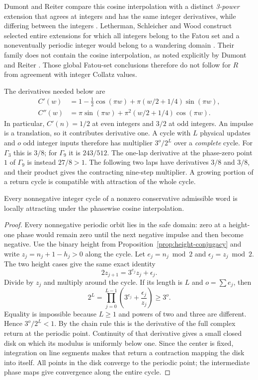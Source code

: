 Dumont and Reiter compare this cosine interpolation with a distinct
\emph{3-power} extension that agrees at integers and has the same
integer derivatives, while differing between the integers
\cite[Sections~1--2]{dumont-reiter-2003}.
Letherman, Schleicher and Wood construct selected entire extensions
for which all integers belong to the Fatou set and a noneventually
periodic integer would belong to a wandering domain
\cite{letherman-schleicher-wood-1999}.
Their family does not contain the cosine interpolation, as noted
explicitly by Dumont and Reiter \cite[Section~1]{dumont-reiter-2003}.
Those global Fatou-set conclusions therefore do not follow for $R$
from agreement with integer Collatz values.

The derivatives needed below are
\begin{align}
 C'(w)&=1-\tfrac12\cos(\pi w)
       +\pi(w/2+1/4)\sin(\pi w),\label{eq:cosine-derivative}\\
 C''(w)&=\pi\sin(\pi w)+\pi^2(w/2+1/4)\cos(\pi w).
 \label{eq:cosine-second}
\end{align}
In particular, $C'(n)=1/2$ at even integers and $3/2$ at odd
integers. An impulse is a translation, so it contributes derivative
one. A cycle with $L$ physical updates and $o$ odd integer inputs
therefore has multiplier $3^o/2^L$ over a \emph{complete} cycle.
For $\Gamma_3$ this is $3/8$; for $\Gamma_9$ it is $243/512$.
The one-lap derivative at the phase-zero point $1$ of $\Gamma_9$
is instead $27/8>1$. The following two laps have derivatives $3/8$
and $3/8$, and their product gives the contracting nine-step
multiplier. A growing portion of a return cycle is compatible with
attraction of the whole cycle.

\begin{proposition}
\label{prop:integer-cycle-attraction}
Every nonnegative integer cycle of a nonzero conservative admissible
word is locally attracting under the phasewise cosine interpolation.
\end{proposition}
\begin{proof}
Every nonnegative periodic orbit lies in the safe domain: zero at a
height-one phase would remain zero until the next negative impulse
and then become negative. Use the binary height from
Proposition~\ref{prop:height-conjugacy} and write
$z_j=n_j+1-h_j>0$ along the cycle. Let
$e_j=n_j\bmod2$ and $\epsilon_j=z_j\bmod2$. The two height cases give
the same exact identity
\[
 2z_{j+1}=3^{e_j}z_j+\epsilon_j.
\]
Divide by $z_j$ and multiply around the cycle. If its length is $L$
and $o=\sum e_j$, then
\[
 2^L=\prod_{j=0}^{L-1}
       \left(3^{e_j}+\frac{\epsilon_j}{z_j}\right)
 \ge3^o.
\]
Equality is impossible because $L\ge1$ and powers of two and three
are different. Hence $3^o/2^L<1$. By the chain rule this is the
derivative of the full complex return at the periodic point. Continuity
of that derivative gives a small closed disk on which its modulus is
uniformly below one. Since the center is fixed, integration on line
segments makes that return a contraction mapping the disk into itself.
All points in the disk converge to the periodic point; the intermediate
phase maps give convergence along the entire cycle.
\end{proof}

